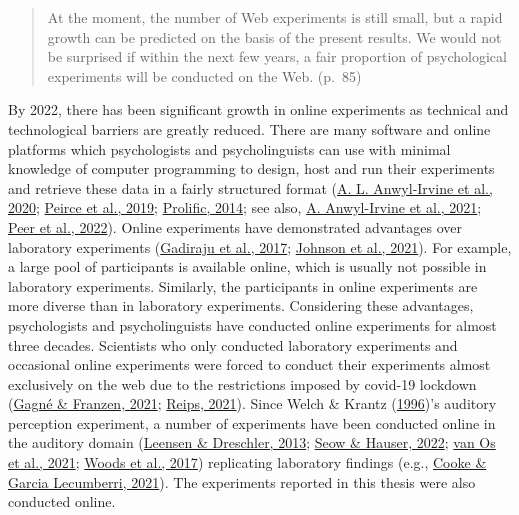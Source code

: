 \documentclass[a4paper, nobind]{templates/ociamthesis}
\begin{document}
\begin{quote}
At the moment, the number of Web experiments is still small, but a rapid growth can be predicted on the basis of the present results.
We would not be surprised if within the next few years, a fair proportion of psychological experiments will be conducted on the Web. (p.~85)
\end{quote}

By 2022, there has been significant growth in online experiments as technical and technological barriers are greatly reduced.
There are many software and online platforms which psychologists and psycholinguists can use with minimal knowledge of computer programming
to design, host and run their experiments and retrieve these data in a fairly structured format (\protect\hyperlink{ref-Anwylirvine2020}{A. L. Anwyl-Irvine et al., 2020}; \protect\hyperlink{ref-Peirce2019}{Peirce et al., 2019}; \protect\hyperlink{ref-Prolific}{Prolific, 2014}; see also, \protect\hyperlink{ref-Anwylirvine2021}{A. Anwyl-Irvine et al., 2021}; \protect\hyperlink{ref-Eyal2022}{Peer et al., 2022}).
Online experiments have demonstrated advantages over laboratory experiments (\protect\hyperlink{ref-Gadiraju2017}{Gadiraju et al., 2017}; \protect\hyperlink{ref-Johnson2021}{Johnson et al., 2021}).
For example, a large pool of participants is available online, which is usually not possible in laboratory experiments.
Similarly, the participants in online experiments are more diverse than in laboratory experiments.
Considering these advantages, psychologists and psycholinguists have conducted online experiments for almost three decades.
Scientists who only conducted laboratory experiments and occasional online experiments were forced to conduct their experiments almost exclusively on the web due to the restrictions imposed by covid-19 lockdown (\protect\hyperlink{ref-Gagne2021}{Gagné \& Franzen, 2021}; \protect\hyperlink{ref-Reips2021}{Reips, 2021}).
Since Welch \& Krantz (\protect\hyperlink{ref-Welch1996}{1996})'s auditory perception experiment, a number of experiments have been conducted online in the auditory domain (\protect\hyperlink{ref-Leensen2013}{Leensen \& Dreschler, 2013}; \protect\hyperlink{ref-Seow2022}{Seow \& Hauser, 2022}; \protect\hyperlink{ref-vanOs2021}{van Os et al., 2021}; \protect\hyperlink{ref-Woods2017}{Woods et al., 2017}) replicating laboratory findings (e.g., \protect\hyperlink{ref-Cooke2021}{Cooke \& Garcia Lecumberri, 2021}).
The experiments reported in this thesis were also conducted online.
\end{document}
